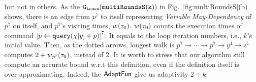         but not in others. 
        As the $\mathtt{{G_{trace}}}(\mathtt{multiRoundsS(k)})$ in Fig.~\ref{fig:multiRoundsS}(b) shows, 
        there is an edge from $p^7$ to itself representing \emph{Variable May-Dependency} of $p^7$ on itself,
        and  $p^7$'s visiting times,
        $w_{}(\mathtt{\tau}_0)$. $w_{}(\mathtt{\tau}_0)$ counts the execution times of command $\clabel{\assign{p}{\query(\chi[y]+p)} }^{7}$. It equals to the loop iteration numbers, i.e., $k$'s initial value.
        Then, as the dotted arrows, 
        longest walk
        is $p^7  \to \cdots \to p^7 \to y^4  \to z^1 $
        computes $2 + w_{p^7}(\mathtt{\tau}_0)$, instead of $2$. It is worth to stress that our algorithm still compute an  accurate bound w.r.t this definition, even if the definition itself is over-approximating. Indeed, the $\textsf{AdaptFun}$  give us adaptivity $2 + k$.
     